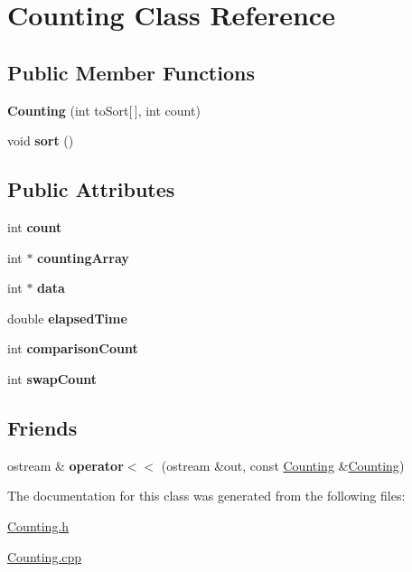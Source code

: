 \hypertarget{class_counting}{}\section{Counting Class Reference}
\label{class_counting}
\subsection*{Public Member Functions}
\begin{DoxyCompactItemize}
\item 
\hypertarget{class_counting_a45a553e27527dbcc2a19bdd2e16b9d68}{}\label{class_counting_a45a553e27527dbcc2a19bdd2e16b9d68} 
{\bfseries Counting} (int to\+Sort\mbox{[}$\,$\mbox{]}, int count)
\item 
\hypertarget{class_counting_aabc4091c5757241ab863d156cfd0e951}{}\label{class_counting_aabc4091c5757241ab863d156cfd0e951} 
void {\bfseries sort} ()
\end{DoxyCompactItemize}
\subsection*{Public Attributes}
\begin{DoxyCompactItemize}
\item 
\hypertarget{class_counting_ae73f933a3aae2ad53b8c9f7f1021ec35}{}\label{class_counting_ae73f933a3aae2ad53b8c9f7f1021ec35} 
int {\bfseries count}
\item 
\hypertarget{class_counting_a13edd53da68bd39b1314ceadc4d0df20}{}\label{class_counting_a13edd53da68bd39b1314ceadc4d0df20} 
int $\ast$ {\bfseries counting\+Array}
\item 
\hypertarget{class_counting_ae0a6f4d05d81e061cbdc5a3c912891da}{}\label{class_counting_ae0a6f4d05d81e061cbdc5a3c912891da} 
int $\ast$ {\bfseries data}
\item 
\hypertarget{class_counting_a99fd344be0baed17653d5e96051037a8}{}\label{class_counting_a99fd344be0baed17653d5e96051037a8} 
double {\bfseries elapsed\+Time}
\item 
\hypertarget{class_counting_aeb45932ab304e1a7a7f707280e9eedfc}{}\label{class_counting_aeb45932ab304e1a7a7f707280e9eedfc} 
int {\bfseries comparison\+Count}
\item 
\hypertarget{class_counting_a0060db34941bcefa4e4727bb01991f96}{}\label{class_counting_a0060db34941bcefa4e4727bb01991f96} 
int {\bfseries swap\+Count}
\end{DoxyCompactItemize}
\subsection*{Friends}
\begin{DoxyCompactItemize}
\item 
\hypertarget{class_counting_a5c21ffe55d3be9e5c625c5c2431ec3f3}{}\label{class_counting_a5c21ffe55d3be9e5c625c5c2431ec3f3} 
ostream \& {\bfseries operator$<$$<$} (ostream \&out, const \hyperlink{class_counting}{Counting} \&\hyperlink{class_counting}{Counting})
\end{DoxyCompactItemize}


The documentation for this class was generated from the following files\+:\begin{DoxyCompactItemize}
\item 
\hyperlink{_counting_8h}{Counting.\+h}\item 
\hyperlink{_counting_8cpp}{Counting.\+cpp}\end{DoxyCompactItemize}
